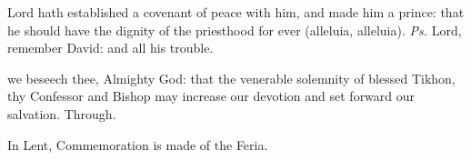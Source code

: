 \vspace{-0.3\baselineskip}

\introit

\vspace{-0.1\baselineskip}

 Lord hath established a covenant of peace with him, and made him a prince: that he should have the dignity of the priesthood for ever (alleluia, alleluia). \textit{Ps.} Lord, remember David: and all his trouble.

\vspace{-0.3\baselineskip}

\collect

\vspace{-0.1\baselineskip}

 we beseech thee, Almighty God: that the venerable solemnity of blessed Tikhon, thy Confessor and Bishop may increase our devotion and set forward our salvation. Through.
\begin{rubric}
    In Lent, Commemoration is made of the Feria.%
\end{rubric}

